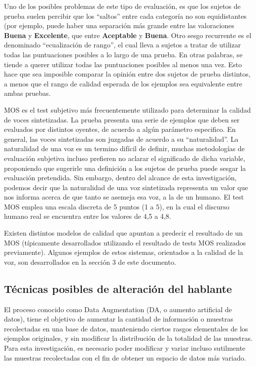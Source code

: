 Uno de los posibles problemas de este tipo de evaluación, es que los sujetos de prueba suelen percibir que los “saltos'' entre cada categoría no son equidistantes (por ejemplo, puede haber una separación más grande entre las valoraciones \textbf{Buena} y \textbf{Excelente}, que entre \textbf{Aceptable} y \textbf{Buena}. Otro sesgo recurrente es el denominado “ecualización de rango'', el cual lleva a sujetos a tratar de utilizar todas las puntuaciones posibles a lo largo de una prueba. En otras palabras, se tiende a querer utilizar todas las puntuaciones posibles al menos una vez. Esto hace que sea imposible comparar la opinión entre dos sujetos de prueba distintos, a menos que el rango de calidad esperada de los ejemplos sea equivalente entre ambas pruebas.

MOS es el test subjetivo más frecuentemente utilizado para determinar la calidad de voces sintetizadas. La prueba presenta una serie de ejemplos que deben ser evaluados por distintos oyentes, de acuerdo a algún parámetro especifico. En general, las voces sintetizadas son juzgadas de acuerdo a su “naturalidad''. La naturalidad de una voz es un termino difícil de definir, muchas metodologías de evaluación subjetiva incluso prefieren no aclarar el significado de dicha variable, proponiendo que sugerirle una definición a los sujetos de prueba puede sesgar la evaluación pretendida. Sin embargo, dentro del alcance de esta investigación, podemos decir que la naturalidad de una voz sintetizada representa un valor que nos informa acerca de que tanto se asemeja esa voz, a la de un humano. El test MOS emplea una escala discreta de 5 puntos (1 a 5), en la cual el discurso humano real se encuentra entre los valores de 4,5 a 4,8. 

Existen distintos modelos de calidad que apuntan a predecir el resultado de un MOS (típicamente desarrollados utilizando el resultado de tests MOS realizados previamente). Algunos ejemplos de estos sistemas, orientados a la calidad de la voz, son desarrollados en la sección 3 de este documento.

\subsection{Técnicas posibles de alteración del hablante}

El proceso conocido como Data Augmentation (DA, o aumento artificial de datos), tiene el objetivo de aumentar la cantidad de información o muestras recolectadas en una base de datos, manteniendo ciertos rasgos elementales de los ejemplos originales, y sin modificar la distribución de la totalidad de las muestras. Para esta investigación, es necesario poder modificar y variar incluso sutilmente las muestras recolectadas con el fin de obtener un espacio de datos más variado. 

